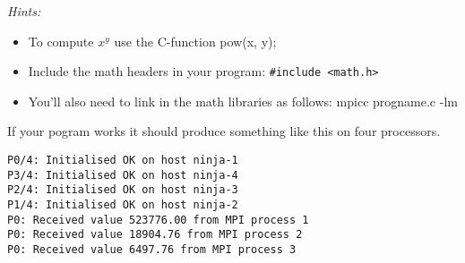 \documentclass[12pt]{article}
\begin{document}
\emph{Hints:}
\begin{itemize}
  \item To compute $x^y$ use the C-function pow(x, y);
  \item Include the math headers in your program: \verb+#include <math.h>+
  \item You'll also need to link in the math libraries as follows: 
     mpicc progname.c -lm
\end{itemize}   

If your pogram works it should produce something like this on four processors.
\begin{verbatim}
P0/4: Initialised OK on host ninja-1
P3/4: Initialised OK on host ninja-4
P2/4: Initialised OK on host ninja-3
P1/4: Initialised OK on host ninja-2
P0: Received value 523776.00 from MPI process 1
P0: Received value 18904.76 from MPI process 2
P0: Received value 6497.76 from MPI process 3
\end{verbatim}
\end{document}
